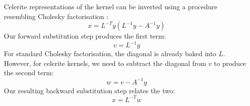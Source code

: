 Celerite representations of the kernel can be inverted using a procedure resembling Cholesky factorisation \cite{foreman-mackay}:
\begin{equation*}
    x = L^{-T}y (L^{-1} y - A^{-1} y)
\end{equation*}
Our forward substitution step produces the first term:
\begin{equation*}
    v = L^{-1} y
\end{equation*}
For standard Cholesky factorisation, the diagonal is already baked into $L$. However, for celerite kernels, we need to subtract the diagonal from $v$ to produce the second term:
\begin{equation*}
    w = v - A^{-1} y 
\end{equation*}
Our resulting backward substitution step relates the two:
\begin{equation*}
    x = L^{-T} w
\end{equation*}
% 
% 
% 
% 
% 
